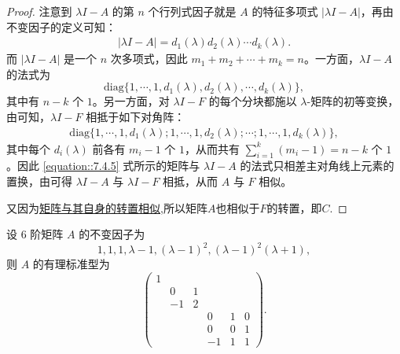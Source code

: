 \documentclass[../../main.tex]{subfiles}
\begin{document}
\begin{proof}
注意到 $\lambda I - A$ 的第 $n$ 个行列式因子就是 $A$ 的特征多项式 $|\lambda I - A|$，再由不变因子的定义可知：
\begin{align*}
|\lambda I - A| = d_1(\lambda)d_2(\lambda)\cdots d_k(\lambda).
\end{align*}
而 $|\lambda I - A|$ 是一个 $n$ 次多项式，因此 $m_1 + m_2 + \cdots + m_k = n$。一方面，$\lambda I - A$ 的法式为
\[
\mathrm{diag}\{1,\cdots,1,d_1(\lambda),d_2(\lambda),\cdots,d_k(\lambda)\},
\]
其中有 $n - k$ 个 $1$。另一方面，对 $\lambda I - F$ 的每个分块都施以 $\lambda$-矩阵的初等变换，由可知，$\lambda I - F$ 相抵于如下对角阵：
\begin{align}
\mathrm{diag}\{1,\cdots,1,d_1(\lambda);1,\cdots,1,d_2(\lambda);\cdots;1,\cdots,1,d_k(\lambda)\},
\label{equation::7.4.5}
\end{align}
其中每个 $d_i(\lambda)$ 前各有 $m_i - 1$ 个 $1$，从而共有 $\sum_{i = 1}^{k}(m_i - 1)=n - k$ 个 $1$。因此 \eqref{equation::7.4.5} 式所示的矩阵与 $\lambda I - A$ 的法式只相差主对角线上元素的置换，由可得 $\lambda I - A$ 与 $\lambda I - F$ 相抵，从而 $A$ 与 $F$ 相似。

又因为\hyperref[proposition:lambda-矩阵一定与其转置相似]{矩阵与其自身的转置相似},所以矩阵$A$也相似于$F$的转置，即$C$.

\end{proof}

\begin{example}
设 6 阶矩阵 $A$ 的不变因子为
\[
1,1,1,\lambda - 1,(\lambda - 1)^2,(\lambda - 1)^2(\lambda + 1),
\]
则 $A$ 的有理标准型为
\[
\begin{pmatrix}
1 & & & & & \\
& 0 & 1 & & & \\
& -1 & 2 & & & \\
& & & 0 & 1 & 0 \\
& & & 0 & 0 & 1 \\
& & & -1 & 1 & 1
\end{pmatrix}.
\] 
\end{example}
\end{document}
